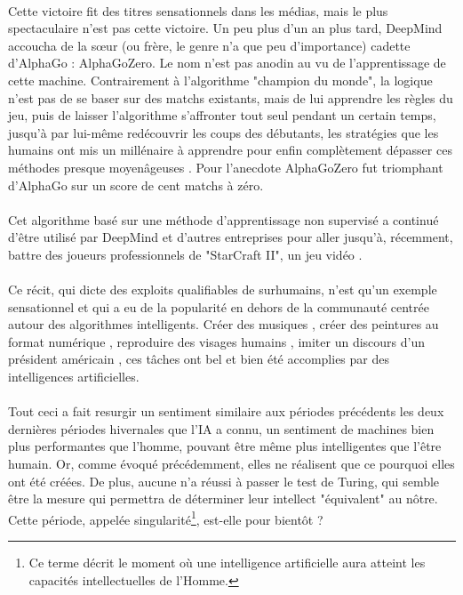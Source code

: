 \documentclass[10pt, french, a4paper]{article}
\begin{document}
\paragraph{}
Cette victoire fit des titres sensationnels dans les médias, mais le plus spectaculaire n’est pas cette victoire. Un peu plus d’un an plus tard, DeepMind accoucha de la sœur (ou frère, le genre n’a que peu d’importance) cadette d’AlphaGo : AlphaGoZero. Le nom n’est pas anodin au vu de l’apprentissage de cette machine. Contrairement à l’algorithme "champion du monde", la logique n’est pas de se baser sur des matchs existants, mais de lui apprendre les règles du jeu, puis de laisser l’algorithme s’affronter tout seul pendant un certain temps, jusqu’à par lui-même redécouvrir les coups des débutants, les stratégies que les humains ont mis un millénaire à apprendre pour enfin complètement dépasser ces méthodes presque moyenâgeuses \citep{silver_mastering_2017}. Pour l’anecdote AlphaGoZero fut triomphant d’AlphaGo sur un score de cent matchs à zéro.

\paragraph{}
Cet algorithme basé sur une méthode d’apprentissage non supervisé a continué d’être utilisé par DeepMind et d’autres entreprises pour aller jusqu’à, récemment, battre des joueurs professionnels de "StarCraft II", un jeu vidéo \citep{vinyals_alphastar:_2019}.

\paragraph{}
Ce récit, qui dicte des exploits qualifiables de surhumains, n’est qu’un exemple sensationnel et qui a eu de la popularité en dehors de la communauté centrée autour des algorithmes intelligents. Créer des musiques \citep{medeot_structurenet:_2018}, créer des peintures au format numérique \citep{mordvintsev_inceptionism:_2015}, reproduire des visages humains \citep{karras_style-based_2018}, imiter un discours d’un président américain \citep{suwajanakorn_synthesizing_2017}, ces tâches ont bel et bien été accomplies par des intelligences artificielles.

\paragraph{}
Tout ceci a fait resurgir un sentiment similaire aux périodes précédents les deux dernières périodes hivernales que l’IA a connu, un sentiment de machines bien plus performantes que l’homme, pouvant être même plus intelligentes que l’être humain. Or, comme évoqué précédemment, elles ne réalisent que ce pourquoi elles ont été créées. De plus, aucune n’a réussi à passer le test de Turing, qui semble être la mesure qui permettra de déterminer leur intellect "équivalent" au nôtre. Cette période, appelée singularité\footnote{Ce terme décrit le moment où une intelligence artificielle aura atteint les capacités intellectuelles de l’Homme.}, est-elle pour bientôt ?
\end{document}

